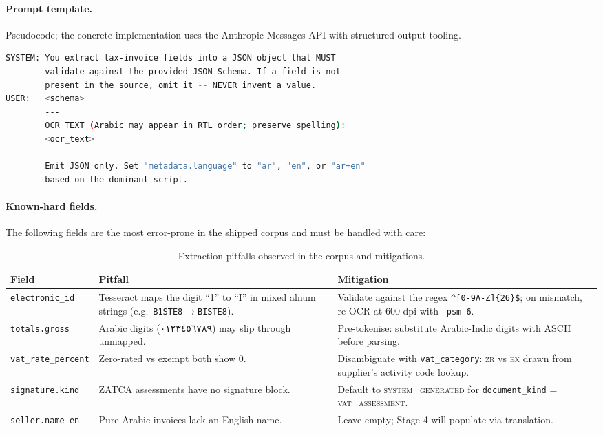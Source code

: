 \documentclass[11pt,a4paper,twoside]{report}
\newcommand{\ar}[1]{#1}
\begin{document}
\paragraph{Prompt template.} Pseudocode; the concrete implementation
uses the Anthropic Messages API with structured-output tooling.

\begin{lstlisting}[language=bash,basicstyle=\ttfamily\small,caption={Schema-guided extraction prompt template.}]
SYSTEM: You extract tax-invoice fields into a JSON object that MUST
        validate against the provided JSON Schema. If a field is not
        present in the source, omit it -- NEVER invent a value.
USER:   <schema>
        ---
        OCR TEXT (Arabic may appear in RTL order; preserve spelling):
        <ocr_text>
        ---
        Emit JSON only. Set "metadata.language" to "ar", "en", or "ar+en"
        based on the dominant script.
\end{lstlisting}

\paragraph{Known-hard fields.} The following fields are the most error-prone
in the shipped corpus and must be handled with care:

\begin{table}[htbp]
\centering
\caption{Extraction pitfalls observed in the corpus and mitigations.}
\label{tab:pitfalls}
\small
\begin{tabularx}{\linewidth}{@{}l X X@{}}
\toprule
\textbf{Field} & \textbf{Pitfall} & \textbf{Mitigation} \\ \midrule
\texttt{electronic\_id}    & Tesseract maps the digit ``1'' to ``I'' in mixed alnum strings (e.g.\ \texttt{B1STE8}$\to$\texttt{BISTE8}). & Validate against the regex \verb|^[0-9A-Z]{26}$|; on mismatch, re-OCR at 600 dpi with \texttt{--psm~6}. \\
\texttt{totals.gross}      & Arabic digits (\ar{٠١٢٣٤٥٦٧٨٩}) may slip through unmapped. & Pre-tokenise: substitute Arabic-Indic digits with ASCII before parsing. \\
\texttt{vat\_rate\_percent}& Zero-rated vs exempt both show $0$. & Disambiguate with \texttt{vat\_category}: \textsc{zr} vs \textsc{ex} drawn from supplier's activity code lookup. \\
\texttt{signature.kind}    & ZATCA assessments have no signature block. & Default to \textsc{system\_generated} for \texttt{document\_kind} = \textsc{vat\_assessment}. \\
\texttt{seller.name\_en}   & Pure-Arabic invoices lack an English name. & Leave empty; Stage 4 will populate via translation. \\
\bottomrule
\end{tabularx}
\end{table}
\end{document}
